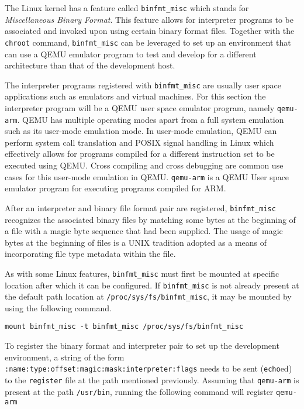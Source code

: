 The Linux kernel has a feature called \texttt{binfmt\_misc} which stands for \textit{Miscellaneous Binary Format}. This feature allows for interpreter programs to be associated and invoked upon using certain binary format files. Together with the \texttt{chroot} command, \texttt{binfmt\_misc} can be leveraged to set up an environment that can use a QEMU emulator program to test and develop for a different architecture than that of the development host.

The interpreter programs registered with \texttt{binfmt\_misc} are usually user space applications such as emulators and virtual machines. For this section the interpreter program will be a QEMU user space emulator program, namely \texttt{qemu-arm}. QEMU has multiple operating modes apart from a full system emulation such as its user-mode emulation mode. In user-mode emulation, QEMU can perform system call translation and POSIX signal handling in Linux which effectively allows for programs compiled for a different instruction set to be executed using QEMU. Cross compiling and cross debugging are common use cases for this user-mode emulation in QEMU. \texttt{qemu-arm} is a QEMU User space emulator program for executing programs compiled for ARM.

After an interpreter and binary file format pair are registered, \texttt{binfmt\_misc} recognizes the associated binary files by matching some bytes at the beginning of a file with a magic byte sequence that had been supplied. The usage of magic bytes at the beginning of files is a UNIX tradition adopted as a means of incorporating file type metadata within the file.

As with some Linux features, \texttt{binfmt\_misc} must first be mounted at specific location after which it can be configured. If \texttt{binfmt\_misc} is not already present at the default path location at \texttt{/proc/sys/fs/binfmt\_misc}, it may be mounted by using the following command.

\begin{verbatim}
mount binfmt_misc -t binfmt_misc /proc/sys/fs/binfmt_misc
\end{verbatim}

To register the binary format and interpreter pair to set up the development environment, a string of the form \texttt{:name:type:offset:magic:mask:interpreter:flags} needs to be sent (\texttt{echo}ed) to the \texttt{register} file at the path mentioned previously. Assuming that \texttt{qemu-arm} is present at the path \texttt{/usr/bin}, running the following command will register \texttt{qemu-arm}

